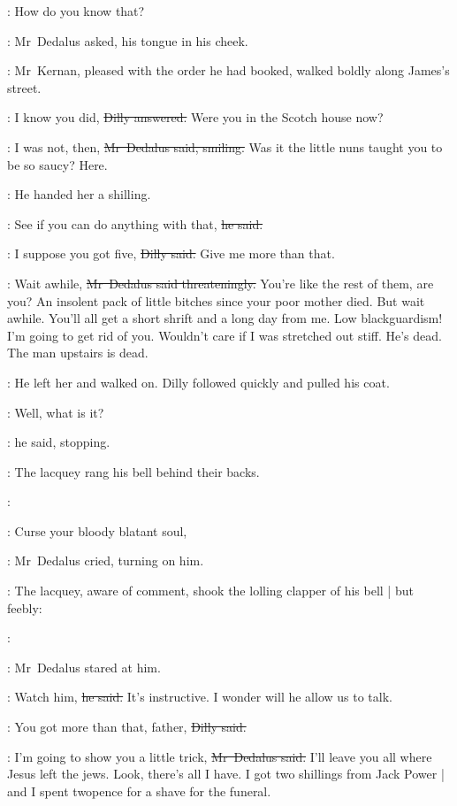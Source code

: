 \simon:
How do you know that?

:
Mr~Dedalus asked,
his tongue in his cheek.

\begin{interject}
    :
    Mr~Kernan,
    pleased with the order he had booked,
    walked boldly along James's street.
\end{interject}

\dilly:
I know you did,
\sout{Dilly answered.}
Were you in the Scotch house now?

\simon:
I was not, then,
\sout{Mr~Dedalus said, smiling.}
Was it the little nuns taught you to be so saucy?
Here.

:
He handed her a shilling.

\simon:
See if you can do anything with that,
\sout{he said.}

\dilly:
I suppose you got five,
\sout{Dilly said.}%
Give me more than that.

\simon:
Wait awhile,
\sout{Mr~Dedalus said threateningly.}
You're like the rest of them, are you?
An insolent pack of little bitches since your poor mother died.
But wait awhile.
You'll all get a short shrift and a long day from me.
Low blackguardism!
I'm going to get rid of you.
Wouldn't care if I was stretched out stiff.
He's dead.
The man upstairs is dead.

:
He left her and walked on.
Dilly followed quickly and pulled his coat.

\simon:
Well, what is it?

:
he said, stopping.

:
The lacquey rang his bell behind their backs.

\bell:

\simon:
Curse your bloody blatant soul,%

:
Mr~Dedalus cried,
turning on him.

:
The lacquey,
aware of comment,
shook the lolling clapper of his bell |
but feebly:

\bell:

:
Mr~Dedalus stared at him.

\simon:
Watch him,
\sout{he said.}
It's instructive.
I wonder will he allow us to talk.

\dilly:
You got more than that, father,
\sout{Dilly said.}

\simon:
I'm going to show you a little trick,
\sout{Mr~Dedalus said.}
I'll leave you all where Jesus left the jews.
Look, there's all I have.
I got two shillings from Jack Power |
and I spent twopence for a shave for the funeral.


